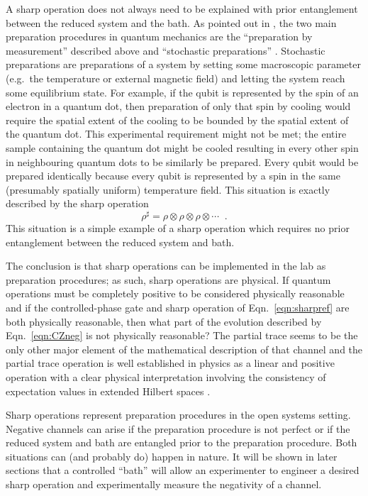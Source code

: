 A sharp operation does not always need to be explained with prior entanglement between the reduced system and the bath.  As pointed out in \cite{Sudarshen2007}, the two main preparation procedures in quantum mechanics are the ``preparation by measurement'' described above and ``stochastic preparations'' \cite{Sudarshen2007}.  Stochastic preparations are preparations of a system by setting some macroscopic parameter (e.g.\ the temperature or external magnetic field) and letting the system reach some equilibrium state.  For example, if the qubit is represented by the spin of an electron in a quantum dot, then preparation of only that spin by cooling would require the spatial extent of the cooling to be bounded by the spatial extent of the quantum dot.  This experimental requirement might not be met; the entire sample containing the quantum dot might be cooled resulting in every other spin in neighbouring quantum dots to be similarly be prepared.  Every qubit would be prepared identically because every qubit is represented by a spin in the same (presumably spatially uniform) temperature field.  This situation is exactly described by the sharp operation
$$
\rho^\sharp = \rho\otimes\rho\otimes\rho\otimes\cdots\;\;.
$$
This situation is a simple example of a sharp operation which requires no prior entanglement between the reduced system and bath.

The conclusion is that sharp operations can be implemented in the lab as preparation procedures; as such, sharp operations are physical.  If quantum operations must be completely positive to be considered physically reasonable and if the controlled-phase gate and sharp operation of Eqn.\ \ref{eqn:sharpref} are both physically reasonable, then what part of the evolution described by Eqn.\ \ref{eqn:CZneg} is not physically reasonable?  The partial trace seems to be the only other major element of the mathematical description of that channel and the partial trace operation is well established in physics as a linear and positive operation \cite{Carlen2010} with a clear physical interpretation involving the consistency of expectation values in extended Hilbert spaces \cite{Cohen1992}.

Sharp operations represent preparation procedures in the open systems setting.  Negative channels can arise if the preparation procedure is not perfect or if the reduced system and bath are entangled prior to the preparation procedure.  Both situations can (and probably do) happen in nature.  It will be shown in later sections that a controlled ``bath'' will allow an experimenter to engineer a desired sharp operation and experimentally measure the negativity of a channel.  
 
